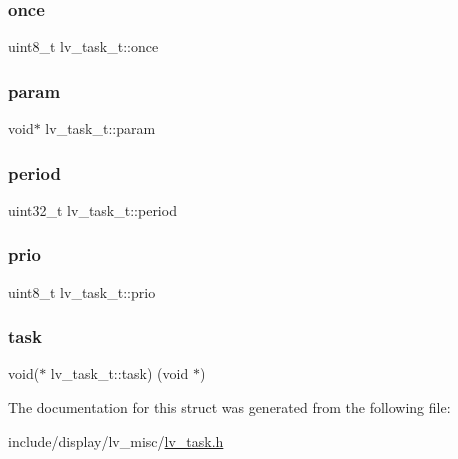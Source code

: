 \mbox{\label{structlv__task__t_a2cc8444292cebc37ae2b7bc08d131cae}} 
\subsubsection{\texorpdfstring{once}{once}}
{\footnotesize\ttfamily uint8\+\_\+t lv\+\_\+task\+\_\+t\+::once}

\mbox{\label{structlv__task__t_a51641918b990f97c1cae127dee63ff82}} 
\subsubsection{\texorpdfstring{param}{param}}
{\footnotesize\ttfamily void$\ast$ lv\+\_\+task\+\_\+t\+::param}

\mbox{\label{structlv__task__t_ab2312571018df52165cbee9002845121}} 
\subsubsection{\texorpdfstring{period}{period}}
{\footnotesize\ttfamily uint32\+\_\+t lv\+\_\+task\+\_\+t\+::period}

\mbox{\label{structlv__task__t_a18791b64e62795e52e64acdf9a632135}} 
\subsubsection{\texorpdfstring{prio}{prio}}
{\footnotesize\ttfamily uint8\+\_\+t lv\+\_\+task\+\_\+t\+::prio}

\mbox{\label{structlv__task__t_a81bcd122b91bc72bb358b4d03e60db1d}} 
\subsubsection{\texorpdfstring{task}{task}}
{\footnotesize\ttfamily void($\ast$ lv\+\_\+task\+\_\+t\+::task) (void $\ast$)}



The documentation for this struct was generated from the following file\+:\begin{DoxyCompactItemize}
\item 
include/display/lv\+\_\+misc/\mbox{\hyperlink{lv__task_8h}{lv\+\_\+task.\+h}}\end{DoxyCompactItemize}
